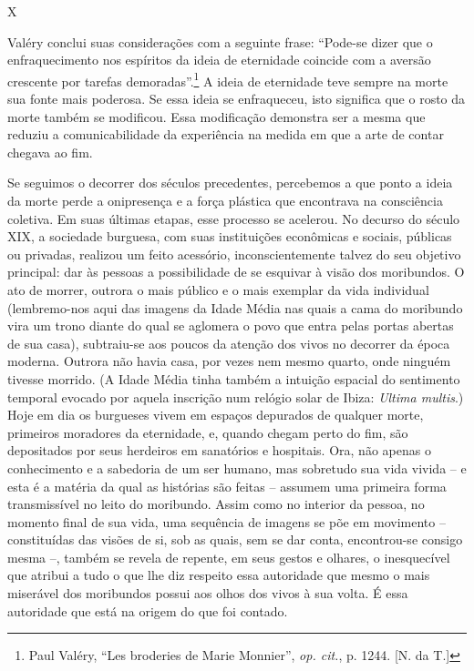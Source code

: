 X

Valéry conclui suas considerações com a seguinte frase: ``Pode-se dizer
que o enfraquecimento nos espíritos da ideia de eternidade coincide com
a aversão crescente por tarefas demoradas''.\footnote{Paul Valéry, ``Les
  broderies de Marie Monnier'', \emph{op. cit.}, p. 1244. {[}N. da T.{]}}
A ideia de eternidade teve sempre na morte sua fonte mais poderosa. Se
essa ideia se enfraqueceu, isto significa que o rosto da morte também se
modificou. Essa modificação demonstra ser a mesma que reduziu a
comunicabilidade da experiência na medida em que a arte de contar
chegava ao fim.

Se seguimos o decorrer dos séculos precedentes, percebemos a que ponto a
ideia da morte perde a onipresença e a força plástica que encontrava na
consciência coletiva. Em suas últimas etapas, esse processo se acelerou.
No decurso do século XIX, a sociedade burguesa, com suas instituições
econômicas e sociais, públicas ou privadas, realizou um feito acessório,
inconscientemente talvez do seu objetivo principal: dar às pessoas a
possibilidade de se esquivar à visão dos moribundos. O ato de morrer,
outrora o mais público e o mais exemplar da vida individual
(lembremo-nos aqui das imagens da Idade Média nas quais a cama do
moribundo vira um trono diante do qual se aglomera o povo que entra
pelas portas abertas de sua casa), subtraiu-se aos poucos da atenção dos
vivos no decorrer da época moderna. Outrora não havia casa, por vezes
nem mesmo quarto, onde ninguém tivesse morrido. (A Idade Média tinha
também a intuição espacial do sentimento temporal evocado por aquela
inscrição num relógio solar de Ibiza: \emph{Ultima multis}.) Hoje em dia
os burgueses vivem em espaços depurados de qualquer morte, primeiros
moradores da eternidade, e, quando chegam perto do fim, são depositados
por seus herdeiros em sanatórios e hospitais. Ora, não apenas o
conhecimento e a sabedoria de um ser humano, mas sobretudo sua vida
vivida -- e esta é a matéria da qual as histórias são feitas -- assumem
uma primeira forma transmissível no leito do moribundo. Assim como no
interior da pessoa, no momento final de sua vida, uma sequência de
imagens se põe em movimento -- constituídas das visões de si, sob as
quais, sem se dar conta, encontrou-se consigo mesma --, também se revela
de repente, em seus gestos e olhares, o inesquecível que atribui a tudo
o que lhe diz respeito essa autoridade que mesmo o mais miserável dos
moribundos possui aos olhos dos vivos à sua volta. É essa autoridade que
está na origem do que foi contado.

